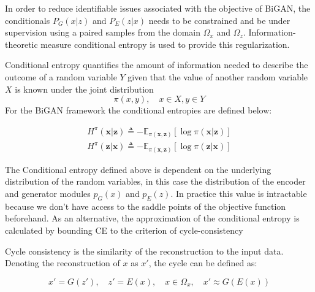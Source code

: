 In order to reduce identifiable issues associated with the objective of BiGAN, the
conditionals $P_{G}(x|z)$ and $P_{E}(z|x)$ needs to be constrained and be under supervision using a
paired samples from the domain $\Omega_{x}$ and $\Omega_{z}$. Information-theoretic measure
conditional entropy is used to provide this regularization. 

Conditional entropy quantifies the amount of information needed to describe the outcome of a random variable 
$Y$ given that the value of another random variable $X$ is known \cite{Cover:2006:EIT:1146355}  under the joint distribution 
$$
\pi(x ,y ) ,\quad x \in X , y \in Y
$$ 
For the BiGAN framework the conditional entropies are defined below:

\begin{align}
    H^{\pi}(\boldsymbol{x} | \boldsymbol{z}) \triangleq-\mathbb{E}_{\pi(\boldsymbol{x}, \boldsymbol{z})}[\log \pi(\boldsymbol{x} | \boldsymbol{z})] \\[5pt]
    H^{\pi}(\boldsymbol{z} | \boldsymbol{x}) \triangleq-\mathbb{E}_{\pi(\boldsymbol{x}, \boldsymbol{z})}[\log \pi(\boldsymbol{z} | \boldsymbol{x})] 
\end{align}

The Conditional entropy defined above is dependent on the underlying distribution of the random
variables, in this case the distribution of the encoder and generator modules $p_{G}(x)$ and
$p_{E}(z)$. In practice this value is intractable because we don't have access to the saddle points
of the objective function beforehand. As an alternative, the approximation of the conditional
entropy is calculated by bounding CE to the criterion of cycle-consistency \cite{Zhu2017UnpairedIT}

Cycle consistency is the similarity of the reconstruction to the input data. Denoting the
reconstruction of $x$ as $x'$, the cycle can be defined as: 

\begin{equation}
  x' = G(z'), \quad z' = E(x),\quad x \in \Omega_{x},\quad x' \approx G(E(x)) 
\end{equation}

